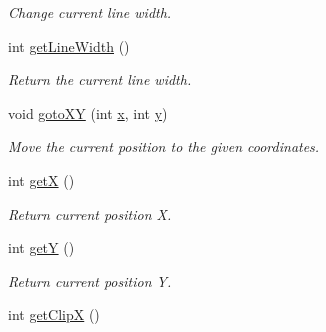 \begin{DoxyCompactItemize}
\begin{DoxyCompactList}\small\item\em Change current line width. \end{DoxyCompactList}\item 
\hypertarget{classGUI_1_1Drawable_a51983595f2264c5a58cde822c5b2e99a}{int \hyperlink{classGUI_1_1Drawable_a51983595f2264c5a58cde822c5b2e99a}{get\-Line\-Width} ()}\label{classGUI_1_1Drawable_a51983595f2264c5a58cde822c5b2e99a}

\begin{DoxyCompactList}\small\item\em Return the current line width. \end{DoxyCompactList}\item 
\hypertarget{classGUI_1_1Drawable_ab6f3428e79e905e81604d735e847ed2a}{void \hyperlink{classGUI_1_1Drawable_ab6f3428e79e905e81604d735e847ed2a}{goto\-X\-Y} (int \hyperlink{classGUI_1_1Drawable_a098294925bd310aa41080a2441790b80}{x}, int \hyperlink{classGUI_1_1Drawable_a574c99954cc268937f2c66ebe1332316}{y})}\label{classGUI_1_1Drawable_ab6f3428e79e905e81604d735e847ed2a}

\begin{DoxyCompactList}\small\item\em Move the current position to the given coordinates. \end{DoxyCompactList}\item 
\hypertarget{classGUI_1_1Drawable_a5a3f0f200d175a9ecbf52af9ab2d0545}{int \hyperlink{classGUI_1_1Drawable_a5a3f0f200d175a9ecbf52af9ab2d0545}{get\-X} ()}\label{classGUI_1_1Drawable_a5a3f0f200d175a9ecbf52af9ab2d0545}

\begin{DoxyCompactList}\small\item\em Return current position X. \end{DoxyCompactList}\item 
\hypertarget{classGUI_1_1Drawable_af3d4cc4db49ce4fb3d6228696309ea0e}{int \hyperlink{classGUI_1_1Drawable_af3d4cc4db49ce4fb3d6228696309ea0e}{get\-Y} ()}\label{classGUI_1_1Drawable_af3d4cc4db49ce4fb3d6228696309ea0e}

\begin{DoxyCompactList}\small\item\em Return current position Y. \end{DoxyCompactList}\item 
\hypertarget{classGUI_1_1Drawable_a94ed40bdbbc36ed75d76152c635c9e3f}{int \hyperlink{classGUI_1_1Drawable_a94ed40bdbbc36ed75d76152c635c9e3f}{get\-Clip\-X} ()}\label{classGUI_1_1Drawable_a94ed40bdbbc36ed75d76152c635c9e3f}


\end{DoxyCompactItemize}
